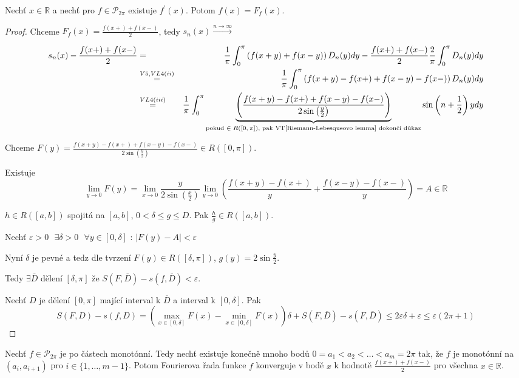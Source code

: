 \begin{dusledek}
Nechť $x \in \mathbb{R}$ a nechť pro $f \in \mathcal{P}_{2 \pi}$ existuje $f^\prime (x)$. Potom $f(x)=F_f(x)$.
\end{dusledek}

\begin{proof}
Chceme $F_f(x) = \frac{f(x+) + f(x-)}{2}$, tedy $s_n(x) \overset{n \rightarrow \infty}{\rightarrow}$

\begin{eqnarray}
s_n(x) - \frac{f(x+)+f(x-)}{2} & = & \frac{1}{\pi} \int_0^\pi \left( f(x+y) + f(x-y) \right) D_n(y) dy - \frac{f(x+) + f(x-)}{2} \frac{2}{\pi} \int_0^\pi D_n(y)dy \nonumber\\
& \overset{V5, VL4 (ii)}{=} & \frac{1}{\pi} \int_0^\pi \left( f(x+y) - f(x+) + f(x-y) - f(x-) \right) D_n(y) dy \nonumber\\
& \overset{VL4(iii)}{=} & \frac{1}{\pi} \int_{0}^\pi \underbrace{\left( \frac{f(x+y) - f(x+) + f(x-y) - f(x-)}{2 \sin \left( \frac{y}{2} \right)} \right)}_{\textrm{pokud $\in R([0,\pi])$, pak VT\ref{Riemann-Lebesqueovo lemma} dokončí důkaz}} \sin \left( n + \frac{1}{2} \right)y dy \nonumber
\end{eqnarray}

Chceme $F(y) = \frac{f(x+y) - f(x+) + f(x-y) - f(x-)}{2 \sin \left( \frac{y}{2} \right)} \in R([0,\pi])$. 

Existuje
$$\lim_{y \rightarrow 0} F(y) = \lim_{x \rightarrow 0} \frac{y}{2 \sin \left( \frac{x}{2} \right)} \lim_{y \rightarrow 0} \left( \frac{f(x+y)-f(x+)}{y} + \frac{f(x-y)-f(x-)}{y} \right) = A \in \mathbb{R}$$

\begin{tvrzeni}
$h \in R([a,b])$ spojitá na $[a,b]$, $0 < \delta \leq g \leq D$. Pak $\frac{h}{g} \in R([a,b])$.
\end{tvrzeni}

Nechť $\varepsilon > 0 \textrm{ } \exists \delta > 0 \textrm{ } \forall y \in [0, \delta] \textrm{ : } |F(y)-A| < \varepsilon$

Nyní $\delta$ je pevné a tedz dle tvrzení $F(y) \in R([\delta, \pi])$, $g(y) = 2 \sin \frac{y}{2}$.

Tedy $\exists \overline{D}$ dělení $[\delta, \pi]$ že $S(F,\overline{D}) - s(f,\overline{D}) < \varepsilon$.

Nechť $D$ je dělení $[0,\pi]$ mající interval k $\overline{D}$ a interval k $[0, \delta]$. Pak 
$$S(F, D)-s(f,D) = \left( \max_{x \in [0, \delta]} F(x) - \min_{x \in [0, \delta]} F(x) \right) \delta + S(F, \overline{D}) - s(F, \overline{D}) \leq 2 \varepsilon \delta + \varepsilon \leq \varepsilon (2 \pi + 1)$$
\end{proof}

\begin{vetat}
Nechť $f \in \mathcal{P}_{2\pi}$ je po částech monotónní. Tedy nechť existuje konečně mnoho bodů $0=a_1 < a_2 < \ldots < a_m = 2 \pi$ tak, že $f$ je monotónní na $(a_i, a_{i+1})$ pro $i \in \{1, \ldots, m-1 \}$. Potom Fourierova řada funkce $f$ konverguje v bodě $x$ k hodnotě $\frac{f(x+) + f(x-)}{2}$ pro všechna $x \in \mathbb{R}$.
\end{vetat}